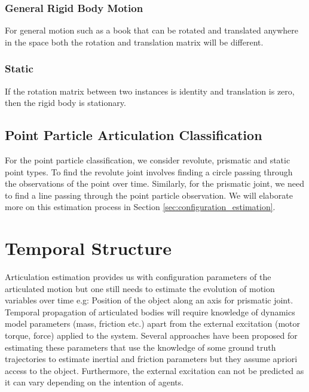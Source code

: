 \documentclass[conference]{IEEEtran}
\begin{document}
\subsubsection{General Rigid Body Motion}
For general motion such as a book that can be rotated and translated anywhere in the space both the rotation and translation matrix will be different. 

\subsubsection{Static} If the rotation matrix between two instances is identity and translation is zero, then the rigid body is stationary.

\subsection{Point Particle Articulation Classification} For the point particle classification, we consider revolute, prismatic and static point types. To find the revolute joint involves finding a circle passing through the observations of the point over time. Similarly, for the prismatic joint, we need to find a line passing through the point particle observation. We will elaborate more on this estimation process in Section \ref{sec:configuration_estimation}. 


\section{Temporal Structure}\label{sec:temporal_structure} Articulation estimation provides us with configuration parameters of the articulated motion but one still needs to estimate the evolution of motion variables over time e.g: Position of the object along an axis for prismatic joint. Temporal propagation of articulated bodies will require knowledge of dynamics model parameters (mass, friction etc.) apart from the external excitation (motor torque, force) applied  to the system. Several approaches have been proposed for estimating these parameters that use the knowledge of some ground truth trajectories to estimate inertial and friction parameters \cite{endres2013learning} but they assume apriori access to the object. Furthermore, the external excitation can not be predicted as it can vary depending on the intention of agents. 
\end{document}
